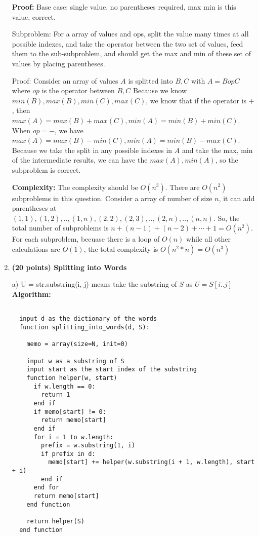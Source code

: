 \documentclass{article}
\newcounter{problem}
\begin{document}
\begin{enumerate}[topsep=0pt]
\textbf{Proof:}
Base case: single value, no parentheses required, max min is this value, correct.

Subproblem: For a array of values and ops, split the value many times at all possible indexes,
and take the operator between the two set of values, feed them to the sub-subproblem,
and should get the max and min of these set of values by placing parentheses.

Proof: Consider an array of values $A$ is splitted into $B,C$ with $A=B op C$ where $op$ is the operator between $B,C$
Because we know $min(B),max(B),min(C),max(C)$,
we know that if the operator is $+$, then $max(A)=max(B)+max(C),min(A)=min(B)+min(C)$.
When $op=-$, we have $max(A)=max(B)-min(C),min(A)=min(B)-max(C)$.
Because we take the split in any possible indexes in $A$ and take the max, min of the intermediate results,
we can have the $max(A),min(A)$, so the subproblem is correct.


\textbf{Complexity:}
The complexity should be $O(n^3)$. There are $O(n^2)$ subproblems in this question. 
Consider a array of number of size $n$, it can add parentheses at $(1,1),(1,2),..,(1,n),(2,2),(2,3),..,(2,n),..,(n,n)$.
So, the total number of subproblems is $n+(n-1)+(n-2)+\cdots+1=O(n^2)$.
For each subproblem, becuase there is a loop of $O(n)$ while all other calculations are $O(1)$,
the total complexity is $O(n^2*n)=O(n^3)$


\item \textbf{(20 points) Splitting into Words} 

a) U = str.substring(i, j) means take the substring of $S$ as $U=S[i..j]$
\textbf{Algorithm:}
\begin{verbatim}
  
  input d as the dictionary of the words
  function splitting_into_words(d, S):

    memo = array(size=N, init=0)

    input w as a substring of S
    input start as the start index of the substring
    function helper(w, start)
      if w.length == 0:
        return 1
      end if
      if memo[start] != 0:
        return memo[start]
      end if
      for i = 1 to w.length:
        prefix = w.substring(1, i)
        if prefix in d:
          memo[start] += helper(w.substring(i + 1, w.length), start + i)
        end if
      end for
      return memo[start]
    end function

    return helper(S)
  end function
\end{verbatim}


\end{enumerate}
\end{document}
